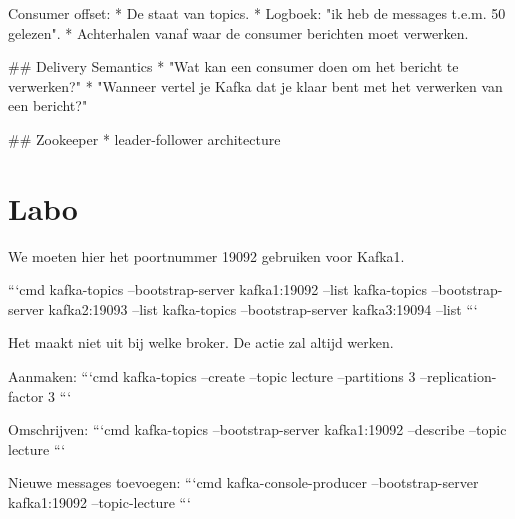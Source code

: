 \documentclass[a4paper,10pt,twoside]{report}
\begin{document}
Consumer offset:
* De staat van topics.
* Logboek: "ik heb de messages t.e.m. 50 gelezen". 
* Achterhalen vanaf waar de consumer berichten moet verwerken.

## Delivery Semantics
* "Wat kan een consumer doen om het bericht te verwerken?"
* "Wanneer vertel je Kafka dat je klaar bent met het verwerken van een bericht?"


## Zookeeper
* leader-follower architecture


\section{Labo}

We moeten hier het poortnummer 19092 gebruiken voor Kafka1. 

```cmd
kafka-topics --bootstrap-server kafka1:19092 --list
kafka-topics --bootstrap-server kafka2:19093 --list
kafka-topics --bootstrap-server kafka3:19094 --list
```

Het maakt niet uit bij welke broker. De actie zal altijd werken.

Aanmaken:
```cmd
kafka-topics --create --topic lecture --partitions 3 --replication-factor 3
```

Omschrijven:
```cmd
kafka-topics --bootstrap-server kafka1:19092 --describe --topic lecture
```

Nieuwe messages toevoegen:
```cmd
kafka-console-producer --bootstrap-server kafka1:19092 --topic-lecture
```
	
\end{document}
